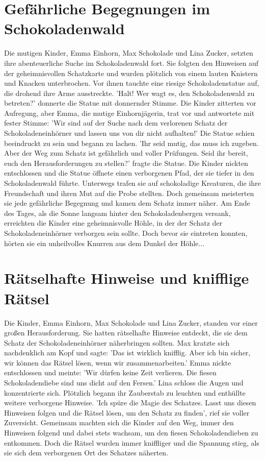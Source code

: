 \documentclass[12pt]{article} %
\begin{document}
\section{ Gefährliche Begegnungen im Schokoladenwald }
\begin{minipage}{\textwidth}
    Die mutigen Kinder, Emma Einhorn, Max Schokolade und Lina Zucker, setzten ihre abenteuerliche Suche im Schokoladenwald fort. Sie folgten den Hinweisen auf der geheimnisvollen Schatzkarte und wurden plötzlich von einem lauten Knistern und Knacken unterbrochen. Vor ihnen tauchte eine riesige Schokoladenstatue auf, die drohend ihre Arme ausstreckte. 'Halt! Wer wagt es, den Schokoladenwald zu betreten?' donnerte die Statue mit donnernder Stimme. Die Kinder zitterten vor Aufregung, aber Emma, die mutige Einhornjägerin, trat vor und antwortete mit fester Stimme: 'Wir sind auf der Suche nach dem verlorenen Schatz der Schokoladeneinhörner und lassen uns von dir nicht aufhalten!' Die Statue schien beeindruckt zu sein und begann zu lachen. 'Ihr seid mutig, das muss ich zugeben. Aber der Weg zum Schatz ist gefährlich und voller Prüfungen. Seid ihr bereit, euch den Herausforderungen zu stellen?' fragte die Statue. Die Kinder nickten entschlossen und die Statue öffnete einen verborgenen Pfad, der sie tiefer in den Schokoladenwald führte. Unterwegs trafen sie auf schokoladige Kreaturen, die ihre Freundschaft und ihren Mut auf die Probe stellten. Doch gemeinsam meisterten sie jede gefährliche Begegnung und kamen dem Schatz immer näher. Am Ende des Tages, als die Sonne langsam hinter den Schokoladenbergen versank, erreichten die Kinder eine geheimnisvolle Höhle, in der der Schatz der Schokoladeneinhörner verborgen sein sollte. Doch bevor sie eintreten konnten, hörten sie ein unheilvolles Knurren aus dem Dunkel der Höhle...
\end{minipage}

\section{ Rätselhafte Hinweise und knifflige Rätsel }
\begin{minipage}{\textwidth}
    Die Kinder, Emma Einhorn, Max Schokolade und Lina Zucker, standen vor einer großen Herausforderung. Sie hatten rätselhafte Hinweise entdeckt, die sie dem Schatz der Schokoladeneinhörner näherbringen sollten. Max kratzte sich nachdenklich am Kopf und sagte: 'Das ist wirklich knifflig. Aber ich bin sicher, wir können das Rätsel lösen, wenn wir zusammenarbeiten.' Emma nickte entschlossen und meinte: 'Wir dürfen keine Zeit verlieren. Die fiesen Schokoladendiebe sind uns dicht auf den Fersen.' Lina schloss die Augen und konzentrierte sich. Plötzlich begann ihr Zauberstab zu leuchten und enthüllte weitere verborgene Hinweise. 'Ich spüre die Magie des Schatzes. Lasst uns diesen Hinweisen folgen und die Rätsel lösen, um den Schatz zu finden', rief sie voller Zuversicht. Gemeinsam machten sich die Kinder auf den Weg, immer den Hinweisen folgend und dabei stets wachsam, um den fiesen Schokoladendieben zu entkommen. Doch die Rätsel wurden immer kniffliger und die Spannung stieg, als sie sich dem verborgenen Ort des Schatzes näherten.
\end{minipage}
\end{document}
